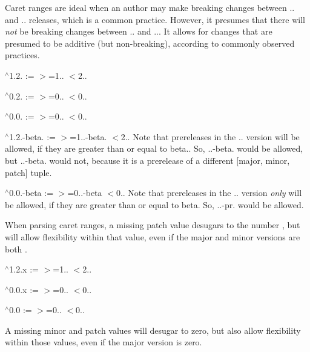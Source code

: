 Caret ranges are ideal when an author may make breaking changes between {..} and {..} releases, which is a common practice. However, it presumes that there will {\itshape not} be breaking changes between {..} and {..}. It allows for changes that are presumed to be additive (but non-\/breaking), according to commonly observed practices.


\begin{DoxyItemize}
\item {\ttfamily $^\wedge$1.2.} \+:= {\ttfamily $>$=1.. $<$2..}
\item {\ttfamily $^\wedge$0.2.} \+:= {\ttfamily $>$=0.. $<$0..}
\item {\ttfamily $^\wedge$0.0.} \+:= {\ttfamily $>$=0.. $<$0..}
\item {\ttfamily $^\wedge$1.2.-\/beta.} \+:= {\ttfamily $>$=1..-\/beta. $<$2..} Note that prereleases in the {..} version will be allowed, if they are greater than or equal to {\ttfamily beta.}. So, {..-\/beta.} would be allowed, but {..-\/beta.} would not, because it is a prerelease of a different {\ttfamily \mbox{[}major, minor, patch\mbox{]}} tuple.
\item {\ttfamily $^\wedge$0.0.-\/beta} \+:= {\ttfamily $>$=0..-\/beta $<$0..} Note that prereleases in the {..} version {\itshape only} will be allowed, if they are greater than or equal to {\ttfamily beta}. So, {..-\/pr.} would be allowed.
\end{DoxyItemize}

When parsing caret ranges, a missing {\ttfamily patch} value desugars to the number {}, but will allow flexibility within that value, even if the major and minor versions are both {}.


\begin{DoxyItemize}
\item {\ttfamily $^\wedge$1.2.\+x} \+:= {\ttfamily $>$=1.. $<$2..}
\item {\ttfamily $^\wedge$0.0.\+x} \+:= {\ttfamily $>$=0.. $<$0..}
\item {\ttfamily $^\wedge$0.0} \+:= {\ttfamily $>$=0.. $<$0..}
\end{DoxyItemize}

A missing {\ttfamily minor} and {\ttfamily patch} values will desugar to zero, but also allow flexibility within those values, even if the major version is zero.


